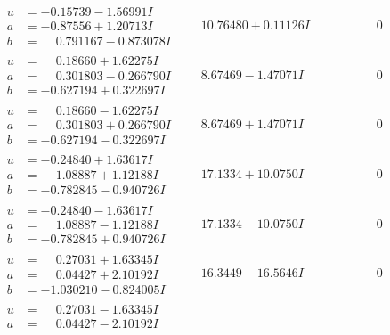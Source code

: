 \documentclass[1p]{elsarticle_modified}
\theoremstyle{definition}
\begin{document}
$$\begin{array}{c|c|c}
 \hline 
\begin{aligned}
u &= -0.15739 - 1.56991 I \\
a &= -0.87556 + 1.20713 I \\
b &= \phantom{-}0.791167 - 0.873078 I\end{aligned}
 & \phantom{-}10.76480 + 0.11126 I & \phantom{-0.000000 } 0 \\ \hline\begin{aligned}
u &= \phantom{-}0.18660 + 1.62275 I \\
a &= \phantom{-}0.301803 - 0.266790 I \\
b &= -0.627194 + 0.322697 I\end{aligned}
 & \phantom{-}8.67469 - 1.47071 I & \phantom{-0.000000 } 0 \\ \hline\begin{aligned}
u &= \phantom{-}0.18660 - 1.62275 I \\
a &= \phantom{-}0.301803 + 0.266790 I \\
b &= -0.627194 - 0.322697 I\end{aligned}
 & \phantom{-}8.67469 + 1.47071 I & \phantom{-0.000000 } 0 \\ \hline\begin{aligned}
u &= -0.24840 + 1.63617 I \\
a &= \phantom{-}1.08887 + 1.12188 I \\
b &= -0.782845 - 0.940726 I\end{aligned}
 & \phantom{-}17.1334 + 10.0750 I & \phantom{-0.000000 } 0 \\ \hline\begin{aligned}
u &= -0.24840 - 1.63617 I \\
a &= \phantom{-}1.08887 - 1.12188 I \\
b &= -0.782845 + 0.940726 I\end{aligned}
 & \phantom{-}17.1334 - 10.0750 I & \phantom{-0.000000 } 0 \\ \hline\begin{aligned}
u &= \phantom{-}0.27031 + 1.63345 I \\
a &= \phantom{-}0.04427 + 2.10192 I \\
b &= -1.030210 - 0.824005 I\end{aligned}
 & \phantom{-}16.3449 - 16.5646 I & \phantom{-0.000000 } 0 \\ \hline\begin{aligned}
u &= \phantom{-}0.27031 - 1.63345 I \\
a &= \phantom{-}0.04427 - 2.10192 I \\

\end{aligned}
\end{array}$$
\end{document}
